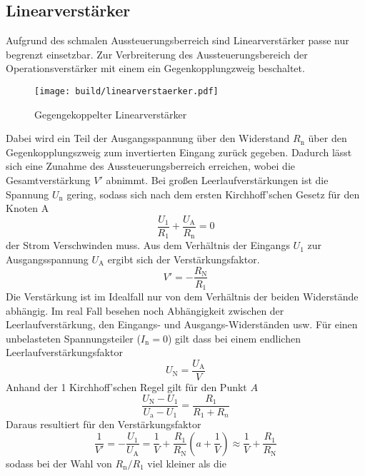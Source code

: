 \subsection{Linearverstärker}%
\label{sub:linearverstaerker}
Aufgrund des schmalen Aussteuerungsberreich sind Linearverstärker passe nur
begrenzt einsetzbar.
Zur Verbreiterung des Aussteuerungsbereich der Operationsverstärker mit einem
ein Gegenkopplungzweig beschaltet.
\begin{figure}[h]
		\centering
		\texttt{[image: build/linearverstaerker.pdf]}
		\caption{Gegengekoppelter Linearverstärker \cite{anleitung}}
		\label{fig:lin}
\end{figure}
Dabei wird ein Teil der Ausgangsspannung über den Widerstand $R_\text{n}$ über
den Gegenkopplungszweig zum invertierten Eingang zurück gegeben.
Dadurch lässt sich eine Zunahme des Aussteuerungsberreich erreichen, wobei die
Gesamtverstärkung $V'$ abnimmt.
Bei großen Leerlaufverstärkungen ist die Spannung $U_\text{n}$ gering, sodass
sich nach dem ersten Kirchhoff'schen Gesetz für den Knoten A
\begin{equation}
		\frac{U_1}{R_1} + \frac{U_\text{A}}{R_\text{n}} = 0
\end{equation}
der Strom Verschwinden muss.
Aus dem Verhältnis der Eingangs $U_1$ zur Ausgangsspannung $U_\text{A}$ ergibt
sich der Verstärkungsfaktor.
\begin{equation}
		V' = - \frac{R_\text{N}}{R_1}
\end{equation}
Die Verstärkung ist im Idealfall nur von dem Verhältnis der beiden
Widerstände abhängig.
Im real Fall besehen noch Abhängigkeit zwischen der Leerlaufverstärkung, den
Eingangs- und Ausgangs-Widerständen usw.
Für einen unbelasteten Spannungsteiler ($I_\text{n} = 0$) gilt dass bei einem
endlichen Leerlaufverstärkungsfaktor
\begin{equation}
		U_\text{N} = \frac{U_\text{A}}{V}
\end{equation}
Anhand der 1 Kirchhoff'schen Regel gilt für den Punkt $A$
\begin{equation}
		\frac{U_\text{N}-U_1}{U_\text{a}-U_1} = \frac{R_1}{R_1 + R_n}
\end{equation}
Daraus resultiert für den Verstärkungsfaktor
\begin{equation}
  \label{eq:v_strich}
		\frac{1}{V'}= - \frac{U_1}{U_\text{A}} = \frac{1}{V} +
		\frac{R_1}{R_\text{N}} \left( a + \frac{1}{V} \right) \approx
		\frac{1}{V} + \frac{R_1}{R_\text{N}}
\end{equation}
sodass bei der Wahl von $R_\text{n}/ R_\text{1}$ viel kleiner als die
